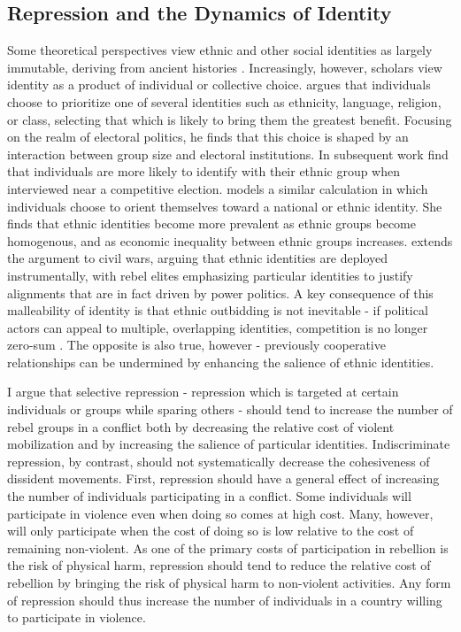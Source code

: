 \documentclass[12pt,]{book}
\begin{document}
\subsection{Repression and the Dynamics of
Identity}\label{repression-and-the-dynamics-of-identity}

Some theoretical perspectives view ethnic and other social identities as
largely immutable, deriving from ancient histories \citep{horowitz85}.
Increasingly, however, scholars view identity as a product of individual
or collective choice. \citet{Posner2005} argues that individuals choose
to prioritize one of several identities such as ethnicity, language,
religion, or class, selecting that which is likely to bring them the
greatest benefit. Focusing on the realm of electoral politics, he finds
that this choice is shaped by an interaction between group size and
electoral institutions. In subsequent work \citet{Eifert2010} find that
individuals are more likely to identify with their ethnic group when
interviewed near a competitive election. \citet{Penn2008} models a
similar calculation in which individuals choose to orient themselves
toward a national or ethnic identity. She finds that ethnic identities
become more prevalent as ethnic groups become homogenous, and as
economic inequality between ethnic groups increases.
\citet{Christia2012} extends the argument to civil wars, arguing that
ethnic identities are deployed instrumentally, with rebel elites
emphasizing particular identities to justify alignments that are in fact
driven by power politics. A key consequence of this malleability of
identity is that ethnic outbidding is not inevitable - if political
actors can appeal to multiple, overlapping identities, competition is no
longer zero-sum \citep{Chandra2005}. The opposite is also true, however
- previously cooperative relationships can be undermined by enhancing
the salience of ethnic identities.

I argue that selective repression - repression which is targeted at
certain individuals or groups while sparing others - should tend to
increase the number of rebel groups in a conflict both by decreasing the
relative cost of violent mobilization and by increasing the salience of
particular identities. Indiscriminate repression, by contrast, should
not systematically decrease the cohesiveness of dissident movements.
First, repression should have a general effect of increasing the number
of individuals participating in a conflict. Some individuals will
participate in violence even when doing so comes at high cost. Many,
however, will only participate when the cost of doing so is low relative
to the cost of remaining non-violent. As one of the primary costs of
participation in rebellion is the risk of physical harm, repression
should tend to reduce the relative cost of rebellion by bringing the
risk of physical harm to non-violent activities. Any form of repression
should thus increase the number of individuals in a country willing to
participate in violence.
\end{document}
